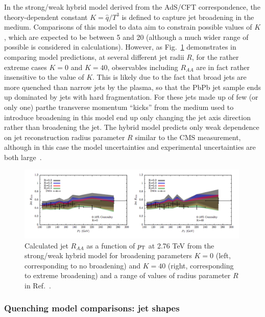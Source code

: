 In the strong/weak hybrid model derived from the AdS/CFT correspondence, the theory-dependent constant $K = \hat{q}/T^{3}$ is defined to capture jet broadening in the medium.  Comparisons of this model to data aim to constrain possible values of $K$, which are expected to be between 5 and 20 (although a much wider range of possible is considered in calculations).  However, as Fig.~\ref{fig:Hybrid_raa} demonstrates in comparing model predictions, at several different jet radii $R$, for the rather extreme cases $K = 0$ and $K = 40$, observables including $R_{AA}$ are in fact rather insensitive to the value of $K$.  This is likely due to the fact that broad jets are more quenched than narrow jets by the plasma, so that the PbPb jet sample ends up dominated by jets with hard fragmentation.  For these jets made up of few (or only one) parthe transverse momentum ``kicks'' from the medium used to introduce broadening in this model end up only changing the jet axis direction rather than broadening the jet.  The hybrid model predicts only weak dependence on jet reconstruction radius parameter $R$ similar to the CMS measurement, although in this case the model uncertainties and experimental uncertainties are both large~\cite{Casalderrey-Solana:2016jvj}. 

\begin{figure}[ht!]
\begin{center}
\includegraphics[width=0.99\textwidth]{figures/Models/Hybrid_Raa.png}
\caption[Calculated jet $R_{AA}$ as a function of $p_{\rm T}$ at 2.76 TeV from the hybrid model ]{Calculated jet $R_{AA}$ as a function of $p_{\rm T}$ at 2.76 TeV from the strong/weak hybrid model for broadening parameters $K = 0$ (left, corresponding to no broadening) and $K = 40$ (right, corresponding to extreme broadening) and a range of values of radius parameter $R$ in Ref.~\cite{Casalderrey-Solana:2016jvj}.}
\label{fig:Hybrid_raa}
\end{center}
\end{figure}



\subsubsection{Quenching model comparisons: jet shapes}
\label{sec:theory_jet_shapes}

